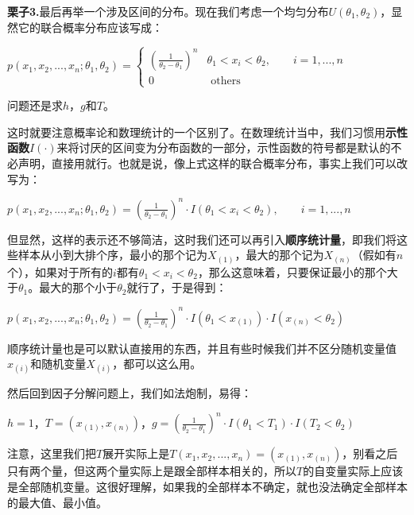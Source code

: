 \documentclass[10pt, a4paper]{article}
\begin{document}
\textbf{栗子3.}最后再举一个涉及区间的分布。现在我们考虑一个均匀分布$U\left(\theta_{1}, \theta_{2}\right)$，显然它的联合概率分布应该写成：
\begin{center}
    $p\left(x_1, x_2,...,x_n ; \theta_{1}, \theta_{2}\right)=\left\{\begin{array}{ll}
        (\frac{1}{\theta_{2}-\theta_{1}})^n & \theta_{1}<x_i<\theta_{2},\qquad i=1,...,n \\
        0 & \text { others }
        \end{array}\right. $   
\end{center}
问题还是求$h$，$g$和$T$。\par
这时就要注意概率论和数理统计的一个区别了。在数理统计当中，我们习惯用\textbf{示性函数$I(·)$}来将讨厌的区间变为分布函数的一部分，示性函数的符号都是默认的不必声明，直接用就行。也就是说，像上式这样的联合概率分布，事实上我们可以改写为：
\begin{center}
    $p\left(x_1, x_2,...,x_n ; \theta_{1}, \theta_{2}\right)= (\frac{1}{\theta_{2}-\theta_{1}})^n·I(\theta_{1}<x_i<\theta_{2}),\qquad i=1,...,n$   
\end{center}\par
但显然，这样的表示还不够简洁，这时我们还可以再引入\textbf{顺序统计量}，即我们将这些样本从小到大排个序，最小的那个记为$X_{(1)}$，最大的那个记为$X_{(n)}$（假如有$n$个），如果对于所有的$i$都有$\theta_{1}<x_i<\theta_{2}$，那么这意味着，只要保证最小的那个大于$\theta_1$。最大的那个小于$\theta_2$就行了，于是得到：
\begin{center}
    $p\left(x_1, x_2,...,x_n ; \theta_{1}, \theta_{2}\right)= (\frac{1}{\theta_{2}-\theta_{1}})^n·I(\theta_{1}<x_{(1)})·I(x_{(n)}<\theta_{2})$   
\end{center}\par
顺序统计量也是可以默认直接用的东西，并且有些时候我们并不区分随机变量值$x_{(i)}$和随机变量$X_{(i)}$，都可以这么用。\par
然后回到因子分解问题上，我们如法炮制，易得：
\begin{center}
    $h=1$，$T=(x_{(1)},x_{(n)})$，$g=(\frac{1}{\theta_{2}-\theta_{1}})^n·I(\theta_{1}<T_1)·I(T_2<\theta_{2})$
\end{center}\par
注意，这里我们把$T$展开实际上是$T(x_1,x_2,...,x_n)=(x_{(1)},x_{(n)})$，别看之后只有两个量，但这两个量实际上是跟全部样本相关的，所以$T$的自变量实际上应该是全部随机变量。这很好理解，如果我的全部样本不确定，就也没法确定全部样本的最大值、最小值。\\\par
\end{document}
